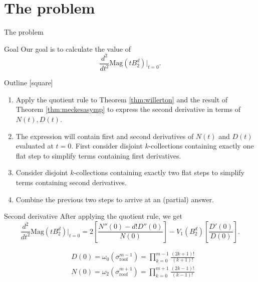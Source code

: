 \documentclass[12pt,mathserif]{beamer}
\begin{document}
\section{The problem}

\begin{frame}[allowframebreaks]{The problem}

\begin{block}{Goal}
Our goal is to calculate the value of
\begin{equation*}
\frac{d^2}{dt^2}\text{Mag}\left(tB_2^d\right)\big\vert_{t=0}.
\end{equation*}
\end{block}

\framebreak

\begin{block}{Outline}
[square]
\begin{enumerate}
\item Apply the quotient rule to Theorem \ref{thm:willerton} and the result of Theorem \ref{thm:meckesasymp} to express the second derivative in terms of $N(t),D(t)$.
\item The expression will contain first and second derivatives of $N(t)$ and $D(t)$ evaluated at $t = 0$. First consider disjoint $k$-collections containing exactly one flat step to simplify terms containing first derivatives.
\item Consider disjoint $k$-collections containing exactly two flat steps to simplify terms containing second derivatives.
\item Combine the previous two steps to arrive at an (partial) answer.
\end{enumerate}
\end{block}

\end{frame}

\begin{frame}{Second derivative}
After applying the quotient rule, we get
\begin{equation*}
\frac{d^2}{dt^2}\text{Mag}\left(tB_2^d\right)\big\vert_{t=0} = 2\left[\frac{N''(0)-d!D''(0)}{N(0)}\right] - V_1\left(B_2^d\right)\left[\frac{D'(0)}{D(0)}\right].
\end{equation*}

\begin{align*}
&D(0) = \omega_0\left(\sigma_\text{roof}^{m-1}\right) = \prod\limits_{k=0}^{m-1}\frac{(2k+1)!}{(k+1)!} \\
&N(0) = \omega_2\left(\sigma_\text{roof}^{m+1}\right) = \prod\limits_{k=0}^{m+1}\frac{(2k-1)!}{(k-1)!}
\end{align*}

\end{frame}
\end{document}
